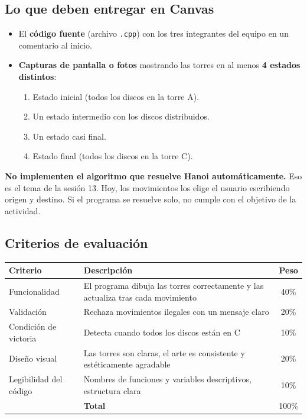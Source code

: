 \documentclass[12pt, oneside]{article}
\begin{document}
\subsection{Lo que deben entregar en Canvas}

\begin{itemize}
  \item El \textbf{código fuente} (archivo \texttt{.cpp}) con los
        tres integrantes del equipo en un comentario al inicio.
  \item \textbf{Capturas de pantalla o fotos} mostrando las torres en
        al menos \textbf{4 estados distintos}:
        \begin{enumerate}
          \item Estado inicial (todos los discos en la torre A).
          \item Un estado intermedio con los discos distribuidos.
          \item Un estado casi final.
          \item Estado final (todos los discos en la torre C).
        \end{enumerate}
\end{itemize}

\begin{advertencia}
  \textbf{No implementen el algoritmo que resuelve Hanoi automáticamente.}
  Eso es el tema de la sesión 13.  Hoy, los movimientos los elige el
  usuario escribiendo origen y destino.  Si el programa se resuelve solo,
  no cumple con el objetivo de la actividad.
\end{advertencia}

\subsection{Criterios de evaluación}

\begin{center}
\begin{tabular}{lp{7cm}c}
  \toprule
  \textbf{Criterio} & \textbf{Descripción} & \textbf{Peso} \\
  \midrule
  Funcionalidad      & El programa dibuja las torres correctamente y
                       las actualiza tras cada movimiento & 40\% \\
  Validación         & Rechaza movimientos ilegales con un mensaje claro & 20\% \\
  Condición de victoria & Detecta cuando todos los discos están en C & 10\% \\
  Diseño visual      & Las torres son claras, el arte es consistente
                       y estéticamente agradable & 20\% \\
  Legibilidad del código & Nombres de funciones y variables descriptivos,
                           estructura clara & 10\% \\
  \bottomrule
  & \textbf{Total} & 100\% \\
  \bottomrule
\end{tabular}
\end{center}
\end{document}
